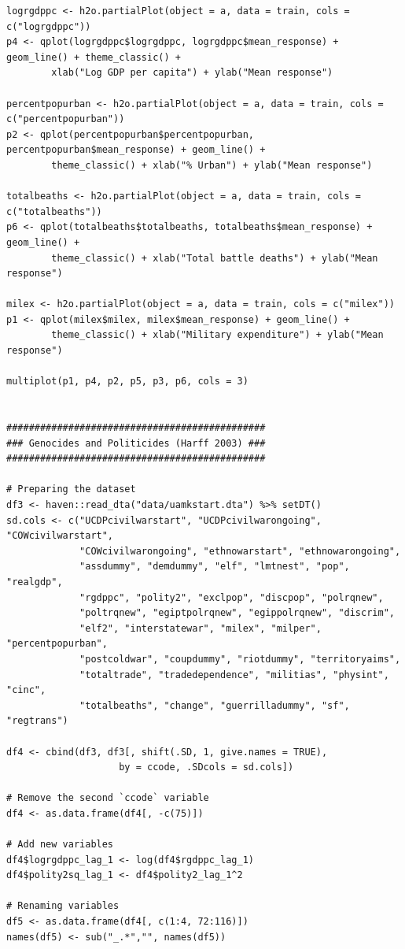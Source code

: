 \documentclass[a4paper,12pt]{article}
\begin{document}
\begin{verbatim}
logrgdppc <- h2o.partialPlot(object = a, data = train, cols = c("logrgdppc"))
p4 <- qplot(logrgdppc$logrgdppc, logrgdppc$mean_response) + geom_line() + theme_classic() +
        xlab("Log GDP per capita") + ylab("Mean response")

percentpopurban <- h2o.partialPlot(object = a, data = train, cols = c("percentpopurban"))
p2 <- qplot(percentpopurban$percentpopurban, percentpopurban$mean_response) + geom_line() +
        theme_classic() + xlab("% Urban") + ylab("Mean response")

totalbeaths <- h2o.partialPlot(object = a, data = train, cols = c("totalbeaths"))
p6 <- qplot(totalbeaths$totalbeaths, totalbeaths$mean_response) + geom_line() +
        theme_classic() + xlab("Total battle deaths") + ylab("Mean response")

milex <- h2o.partialPlot(object = a, data = train, cols = c("milex"))
p1 <- qplot(milex$milex, milex$mean_response) + geom_line() +
        theme_classic() + xlab("Military expenditure") + ylab("Mean response")

multiplot(p1, p4, p2, p5, p3, p6, cols = 3)


##############################################
### Genocides and Politicides (Harff 2003) ###
##############################################

# Preparing the dataset
df3 <- haven::read_dta("data/uamkstart.dta") %>% setDT()
sd.cols <- c("UCDPcivilwarstart", "UCDPcivilwarongoing", "COWcivilwarstart",
             "COWcivilwarongoing", "ethnowarstart", "ethnowarongoing",
             "assdummy", "demdummy", "elf", "lmtnest", "pop", "realgdp",
             "rgdppc", "polity2", "exclpop", "discpop", "polrqnew",
             "poltrqnew", "egiptpolrqnew", "egippolrqnew", "discrim",
             "elf2", "interstatewar", "milex", "milper", "percentpopurban",
             "postcoldwar", "coupdummy", "riotdummy", "territoryaims",
             "totaltrade", "tradedependence", "militias", "physint", "cinc",
             "totalbeaths", "change", "guerrilladummy", "sf", "regtrans")

df4 <- cbind(df3, df3[, shift(.SD, 1, give.names = TRUE),
                    by = ccode, .SDcols = sd.cols]) 

# Remove the second `ccode` variable
df4 <- as.data.frame(df4[, -c(75)])

# Add new variables
df4$logrgdppc_lag_1 <- log(df4$rgdppc_lag_1)
df4$polity2sq_lag_1 <- df4$polity2_lag_1^2

# Renaming variables
df5 <- as.data.frame(df4[, c(1:4, 72:116)])
names(df5) <- sub("_.*","", names(df5)) 


\end{verbatim}
\end{document}
